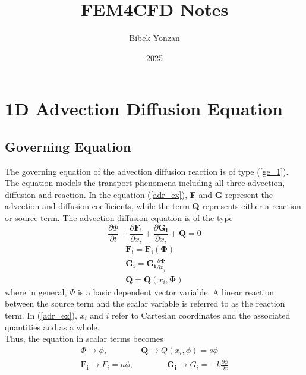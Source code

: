 \documentclass[12pt, oneside]{article}
\title{\textbf{FEM4CFD Notes}}
\author{Bibek Yonzan}
\date{2025}
\begin{document}
\maketitle
\tableofcontents

\vspace{.25in}

\section{1D Advection Diffusion Equation}

\subsection{Governing Equation}
The governing equation of the advection diffusion reaction is of type (\ref{ge_1}). The equation models the transport phenomena including all three advection, diffusion and reaction. In the equation (\ref{adr_ex}), \textbf{F} and \textbf{G} represent the advection and diffusion coefficients, while the term \textbf{Q} represents either a reaction or source term.
The advection diffusion equation is of the type
   \begin{equation}\label{ge_1}
       \frac{\partial\Phi}{\partial t} + \frac{\partial{\boldsymbol{F_i}}}{\partial{x_i}} + \frac{\partial\boldsymbol{G_i}}{\partial{x_i}} + \boldsymbol{Q} = 0
   \end{equation}
    \begin{equation}\label{adr_ex}
          \begin{aligned}
	    \boldsymbol{F_i} = \boldsymbol{F_i}(\boldsymbol{\Phi})\\
	    \boldsymbol{G_i} = \boldsymbol{G_i}\frac{\partial{\boldsymbol{\Phi}}}{\partial{x_j}}\\
	    \boldsymbol{Q} = \boldsymbol{Q}(x_i, \boldsymbol{\Phi})
          \end{aligned}
    \end{equation}
where in general, $\Phi$ is a basic dependent vector variable. A linear reaction between the source term and the scalar variable is referred to as the reaction term. In (\ref{adr_ex}), $x_i$ and $i$ refer to Cartesian coordinates and the associated quantities and as a whole.\\
Thus, the equation in scalar terms becomes
	\begin{equation}
	   \begin{aligned}
		\Phi \rightarrow \phi, \quad \quad \quad \quad \boldsymbol{Q} \rightarrow Q(x_i, \phi) = s \phi\\
		\boldsymbol{F_i} \rightarrow F_i = a\phi, \quad \quad \quad \quad \boldsymbol{G_i} \rightarrow G_i = -k \frac{\partial\phi}{\partial x}
	    \end{aligned}
	\end{equation}
\end{document}
